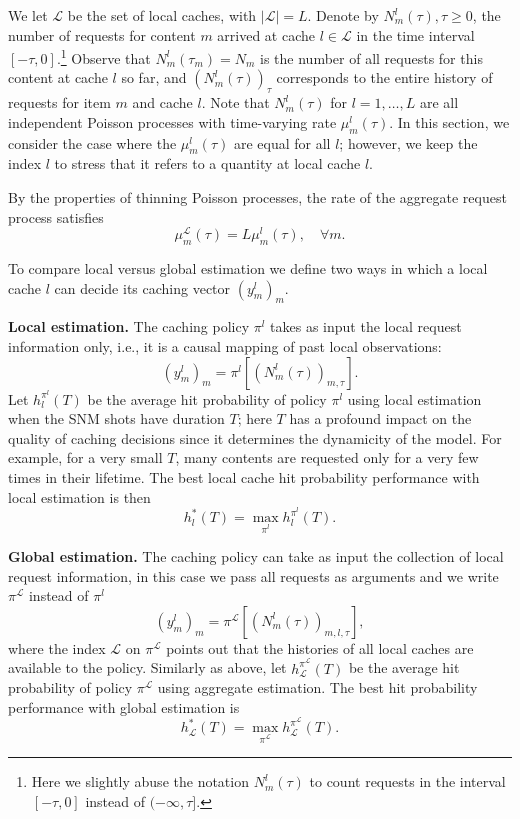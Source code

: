 \documentclass[10pt, conference, letterpaper]{IEEEtran}
\def\Lcal{\mathcal{L}}
\begin{document}
We let $\Lcal$ be the set of local caches, with $|\Lcal|=L$. Denote by $N_m^l(\tau), \tau\geq 0$, the number of requests for content $m$ arrived at cache $l\in\Lcal$ in the time interval $[-\tau,0]$.\footnote{Here we slightly abuse the notation $N_m^l(\tau)$ to count requests in the interval $[-\tau,0]$ instead of $(-\infty,\tau]$.} Observe that $N_m^l(\tau_m)=N_m$ is the number of all requests for this content at cache $l$ so far, and $(N_m^l(\tau))_\tau$ corresponds to the entire history of requests for item $m$ and cache $l$. 
Note that $N_m^l(\tau)$ for $l=1,\dots,L$ are all independent Poisson processes with time-varying rate $\mu^l_m(\tau)$. In this section, we consider the case where the $\mu_m^l(\tau)$ are equal for all $l$; however, we keep the index $l$ to stress that it refers to a quantity at local cache $l$.

By the properties of thinning Poisson processes, the rate of the aggregate request process satisfies
\[
\mu^\mathcal L_m(\tau)=L{\mu}^l_m(\tau), \quad\forall m.
\]

To compare local versus global estimation we  define two ways in which a local cache $l$ can decide its caching vector $(y^l_m)_m$.

\noindent\textbf{Local estimation.} The caching policy $\pi^l$ takes as input the local request information only, i.e., it is a causal mapping of past local observations:
\[
(y_m^l)_m=\pi^l\left[(N_m^l(\tau))_{m,\tau}\right].
\]
Let $h_l^{\pi^l}(T)$ be the average hit probability of policy $\pi^l$ using local estimation when the SNM shots have duration $T$; here
$T$ has a profound impact on the quality of caching decisions since it determines the dynamicity of the model. For example, for a very small $T$, many contents are requested only for a very few times in their lifetime. The best local cache hit probability performance with local estimation is then \[h_l^*(T)=\max_{\pi^l}h_l^{\pi^l}(T).\]




\noindent\textbf{Global estimation.} The caching policy can take as input the collection of local request information, in this case we pass all requests as arguments and we write $\pi^\mathcal L$ instead of $\pi^l$
\[
(y_m^l)_m=\pi^\mathcal L\left[(N^l_m(\tau))_{m,l,\tau}\right],
\]
where the index $\mathcal L$ on $\pi^{\mathcal L}$ points out that the histories of all local caches are available to the policy.
Similarly as above, let $h_\mathcal L^{\pi^\mathcal L}(T)$ be the average hit probability of policy $\pi^\mathcal L$ using aggregate estimation.
The best hit probability performance with global estimation is \[h_\mathcal L^*(T)=\max_{\pi^\mathcal L}h_\mathcal L^{\pi^\mathcal L}(T).\]
\end{document}
